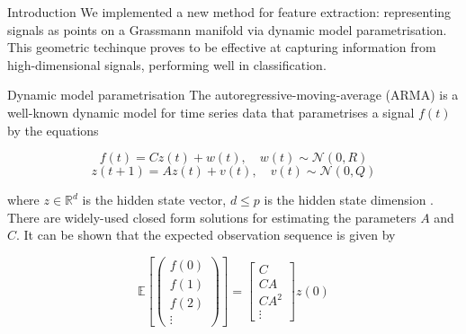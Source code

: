 \documentclass[final]{beamer}
\newlength{\onecolwid}
\begin{document}
\begin{frame}[t]
\begin{columns}[t]
\begin{column}{\onecolwid}
\begin{block}{Introduction}
    We implemented a new method for feature extraction: representing signals as points on a
    Grassmann manifold via dynamic model parametrisation.  This geometric techinque proves to be
    effective at capturing information from high-dimensional signals, performing well in
    classification.
\end{block}


\begin{block}{Dynamic model parametrisation}
    The autoregressive-moving-average (ARMA) is a well-known dynamic model for time series data that
    parametrises a signal $f(t)$ by the equations

    \begin{equation}
        f(t) = Cz(t) + w(t), \quad w(t) \sim \mathcal{N}(0, R)
    \end{equation}
    \begin{equation}
        z(t + 1) = Az(t) + v(t), \quad v(t) \sim \mathcal{N}(0, Q)
    \end{equation}

    where $z \in \mathbb{R}^d$ is the hidden state vector, $d \leq p$ is the hidden state dimension
    \cite{turaga_statistical_2011}. There are widely-used closed form solutions for estimating the
    parameters $A$ and $C$. It can be shown that the expected observation sequence is given by

    \begin{equation}\label{eq:observation}
        \mathbb{E}\left[\begin{pmatrix} f(0) \\ f(1) \\ f(2) \\ \vdots \end{pmatrix}\right]
        = \begin{bmatrix} C \\ CA \\ CA^2 \\ \vdots \end{bmatrix} z(0)
    \end{equation}
\end{block}


\end{column} %


\end{columns}
\end{frame}
\end{document}
